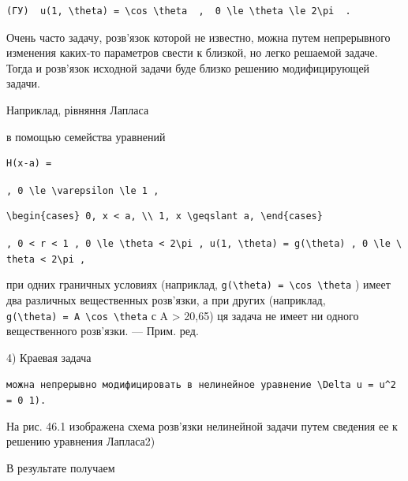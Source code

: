 \documentclass[
  ukrainian,
]{article}
\begin{document}
\begin{verbatim}
(ГУ)  u(1, \theta) = \cos \theta  ,  0 \le \theta \le 2\pi  .
\end{verbatim}

Очень часто задачу, розв'язок которой не известно, можна путем
непрерывного изменения каких-то параметров свести к близкой, но легко
решаемой задаче. Тогда и розв'язок исходной задачи буде близко решению
модифицирующей задачи.

Наприклад, рівняння Лапласа

в помощью семейства уравнений

\begin{verbatim}
H(x-a) =
\end{verbatim}

\texttt{,\ \textquotesingle{}0\ \textbackslash{}le\ \textbackslash{}varepsilon\ \textbackslash{}le\ 1\textquotesingle{}\ ,}

\begin{verbatim}
\begin{cases} 0, x < a, \\ 1, x \geqslant a, \end{cases}
\end{verbatim}

\texttt{,\ \textquotesingle{}0\ \textless{}\ r\ \textless{}\ 1\textquotesingle{}\ ,\ \textquotesingle{}0\ \textbackslash{}le\ \textbackslash{}theta\ \textless{}\ 2\textbackslash{}pi\textquotesingle{}\ ,\ \textquotesingle{}u(1,\ \textbackslash{}theta)\ =\ g(\textbackslash{}theta)\textquotesingle{}\ ,\ \textquotesingle{}0\ \textbackslash{}le\ \textbackslash{}theta\ \textless{}\ 2\textbackslash{}pi\textquotesingle{}\ ,}

при одних граничных условиях (наприклад,
\texttt{g(\textbackslash{}theta)\ =\ \textbackslash{}cos\ \textbackslash{}theta}
) имеет два различных вещественных розв'язки, а при других (наприклад,
\texttt{g(\textbackslash{}theta)\ =\ A\ \textbackslash{}cos\ \textbackslash{}theta}
с A \textgreater{} 20,65) ця задача не имеет ни одного вещественного
розв'язки. --- Прим. ред.

4) Краевая задача

\texttt{можна\ непрерывно\ модифицировать\ в\ нелинейное\ уравнение\ \textquotesingle{}\textbackslash{}Delta\ u\ =\ u\^{}2\ =\ 0\textquotesingle{}\ 1).}

На рис. 46.1 изображена схема розв'язки нелинейной задачи путем сведения
ее к решению уравнения Лапласа2)

В результате получаем
\end{document}
